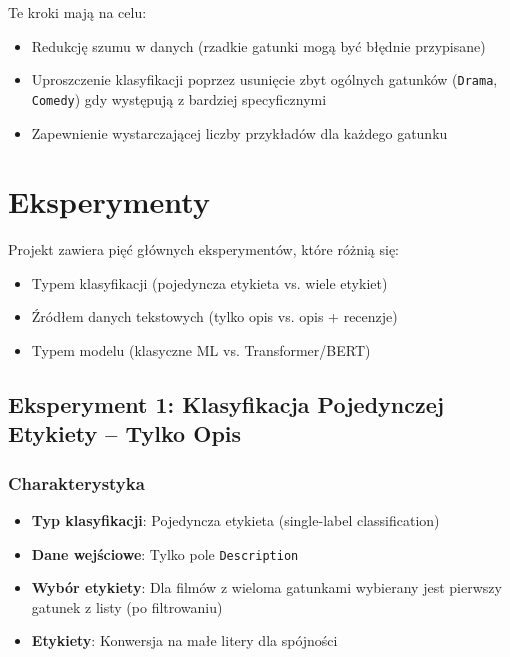 \documentclass[12pt,a4paper]{article}
\begin{document}
Te kroki mają na celu:
\begin{itemize}
    \item Redukcję szumu w danych (rzadkie gatunki mogą być błędnie przypisane)
    \item Uproszczenie klasyfikacji poprzez usunięcie zbyt ogólnych gatunków (\texttt{Drama}, \texttt{Comedy}) gdy występują z bardziej specyficznymi
    \item Zapewnienie wystarczającej liczby przykładów dla każdego gatunku
\end{itemize}

\section{Eksperymenty}

Projekt zawiera pięć głównych eksperymentów, które różnią się:
\begin{itemize}
    \item Typem klasyfikacji (pojedyncza etykieta vs. wiele etykiet)
    \item Źródłem danych tekstowych (tylko opis vs. opis + recenzje)
    \item Typem modelu (klasyczne ML vs. Transformer/BERT)
\end{itemize}

\subsection{Eksperyment 1: Klasyfikacja Pojedynczej Etykiety -- Tylko Opis}

\subsubsection{Charakterystyka}
\begin{itemize}
    \item \textbf{Typ klasyfikacji}: Pojedyncza etykieta (single-label classification)
    \item \textbf{Dane wejściowe}: Tylko pole \texttt{Description}
    \item \textbf{Wybór etykiety}: Dla filmów z wieloma gatunkami wybierany jest pierwszy gatunek z listy (po filtrowaniu)
    \item \textbf{Etykiety}: Konwersja na małe litery dla spójności
\end{itemize}
\end{document}
